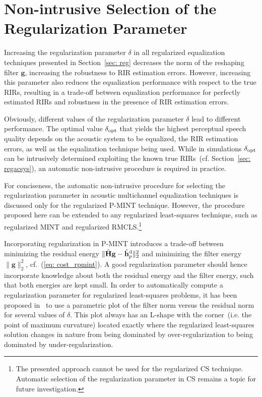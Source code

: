 \documentclass[draftcls,onecolumn,11pt]{IEEEtran}
\begin{document}
\section{Non-intrusive Selection of the Regularization Parameter}
\label{sec: sel_reg}
Increasing the regularization parameter $\delta$ in all regularized equalization techniques presented in Section~\ref{sec: reg} decreases the norm of the reshaping filter $\mathbf{g}$, increasing the robustness to RIR estimation errors.
However, increasing this parameter also reduces the equalization performance with respect to the true RIRs, resulting in a trade-off between equalization performance for perfectly estimated RIRs and robustness in the presence of RIR estimation errors.

Obviously, different values of the regularization parameter $\delta$ lead to different performance.
The optimal value $\delta_{\rm opt}$ that yields the highest perceptual speech quality depends on the acoustic system to be equalized, the RIR estimation errors, as well as the equalization technique being used.
While in simulations $\delta_{\rm opt}$ can be intrusively determined exploiting the known true RIRs~(cf. Section~\ref{sec: regacsys}), an automatic non-intrusive procedure is required in practice.

For conciseness, the automatic non-intrusive procedure for selecting the regularization parameter in acoustic multichannel equalization techniques is discussed only for the regularized P-MINT technique.
However, the procedure proposed here can be extended to any regularized least-squares technique, such as regularized MINT and regularized RMCLS.\footnote{The presented approach cannot be used for the regularized CS technique. Automatic selection of the regularization parameter in CS remains a topic for future investigation.}

Incorporating regularization in P-MINT introduces a trade-off between minimizing the residual energy $\|\hat{\mathbf{H}}\mathbf{g} - \hat{\mathbf{h}}_p^{\rm d} \|_2^2$ and minimizing the filter energy $\|\mathbf{g}\|_2^2$, cf.~(\ref{eq: cost_rpmint}).
A good regularization parameter should hence incorporate knowledge about both the residual energy and the filter energy, such that both energies are kept small.
In order to automatically compute a regularization parameter for regularized least-squares problems, it has been proposed in~\cite{Hansen_1993} to use a parametric plot of the filter norm versus the residual norm for several values of $\delta$.
This plot always has an L-shape with the corner~(i.e. the point of maximum curvature) located exactly where the regularized least-squares solution changes in nature from being dominated by over-regularization to being dominated by under-regularization.
\end{document}
